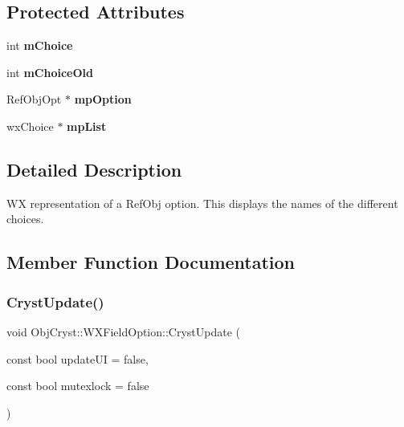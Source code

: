 \subsection*{Protected Attributes}
\begin{DoxyCompactItemize}
\item 
\mbox{\label{class_obj_cryst_1_1_w_x_field_option_a9250ff51e632d03805b802f9938f44ae}} 
int {\bfseries m\+Choice}
\item 
\mbox{\label{class_obj_cryst_1_1_w_x_field_option_a3eeda225deeac7161bafb23340639aba}} 
int {\bfseries m\+Choice\+Old}
\item 
\mbox{\label{class_obj_cryst_1_1_w_x_field_option_a02d2cebdc3f8f6f3da24aebea176ca16}} 
Ref\+Obj\+Opt $\ast$ {\bfseries mp\+Option}
\item 
\mbox{\label{class_obj_cryst_1_1_w_x_field_option_a9e1a3036f23fa841195fbfd98c26fae4}} 
wx\+Choice $\ast$ {\bfseries mp\+List}
\end{DoxyCompactItemize}


\subsection{Detailed Description}
WX representation of a Ref\+Obj option. This displays the names of the different choices. 

\subsection{Member Function Documentation}
\mbox{\label{class_obj_cryst_1_1_w_x_field_option_a311178af180f6e17dbf3de43dac50130}} 
\subsubsection{\texorpdfstring{CrystUpdate()}{CrystUpdate()}}
{\footnotesize\ttfamily void Obj\+Cryst\+::\+W\+X\+Field\+Option\+::\+Cryst\+Update (\begin{DoxyParamCaption}\item[{const bool}]{update\+UI = {\ttfamily false},  }\item[{const bool}]{mutexlock = {\ttfamily false} }\end{DoxyParamCaption})\hspace{0.3cm}{\ttfamily [virtual]}}

